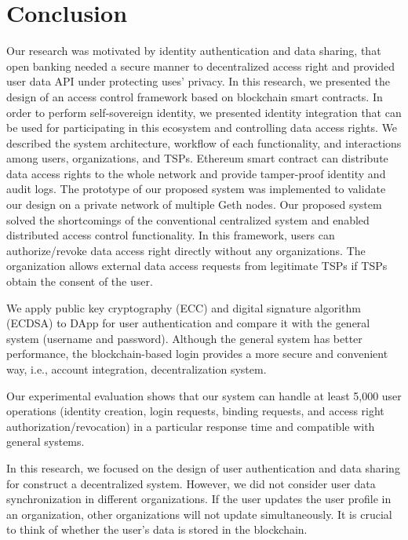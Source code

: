 \chapter{Conclusion}
\label{chapter:conclusion}

Our research was motivated by identity authentication and data sharing, that open banking needed a secure manner to decentralized access right and provided user data API under protecting uses' privacy. In this research, we presented the design of an access control framework based on blockchain smart contracts. In order to perform self-sovereign identity, we presented identity integration that can be used for participating in this ecosystem and controlling data access rights. We described the system architecture, workflow of each functionality, and interactions among users, organizations, and TSPs. Ethereum smart contract can distribute data access rights to the whole network and provide tamper-proof identity and audit logs. 
The prototype of our proposed system was implemented to validate our design on a private network of multiple Geth nodes. Our proposed system solved the shortcomings of the conventional centralized system and enabled distributed access control functionality. In this framework, users can authorize/revoke data access right directly without any organizations. The organization allows external data access requests from legitimate TSPs if TSPs obtain the consent of the user. 
\par

We apply public key cryptography (ECC) and digital signature algorithm (ECDSA) to DApp for user authentication and compare it with the general system (username and password). Although the general system has better performance, the blockchain-based login provides a more secure and convenient way, i.e., account integration, decentralization system.\par

Our experimental evaluation shows that our system can handle at least 5,000 user operations (identity creation, login requests, binding requests, and access right authorization/revocation) in a particular response time and compatible with general systems.\par

In this research, we focused on the design of user authentication and data sharing for construct a decentralized system. However, we did not consider user data synchronization in different organizations. If the user updates the user profile in an organization, other organizations will not update simultaneously. It is crucial to think of whether the user's data is stored in the blockchain.